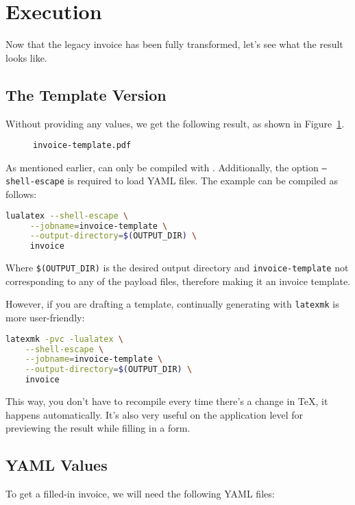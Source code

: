\section{Execution}\label{sec:output}
Now that the legacy invoice has been fully transformed, let's see what the result looks like.

\subsection{The Template Version}
Without providing any values, we get the following result, as shown in Figure~\ref{fig:template}.\\
\setlength\fboxsep{0pt}%
\begin{figure}[!ht]%
    \caption{\texttt{invoice-template.pdf}}\label{fig:template}%
\end{figure}
As mentioned earlier,  can only be compiled with \LuaLaTeX.
Additionally, the option \texttt{--shell-escape} is required to load YAML files.
The example can be compiled as follows:
\begin{lstlisting}[language=bash,caption={Compiling with \texttt{lualatex}}]
lualatex --shell-escape \
     --jobname=invoice-template \
     --output-directory=$(OUTPUT_DIR) \
     invoice
\end{lstlisting}
Where \texttt{\$(OUTPUT\_DIR)} is the desired output directory and \texttt{invoice-template} not corresponding to any of the payload files, therefore making it an invoice template.

However, if you are drafting a template, continually generating with \texttt{latexmk} is more user-friendly:
\begin{lstlisting}[language=bash,caption={Compiling with \texttt{latexmk}}]
latexmk -pvc -lualatex \
    --shell-escape \
    --jobname=invoice-template \
    --output-directory=$(OUTPUT_DIR) \
    invoice
\end{lstlisting}
This way, you don't have to recompile every time there's a change in \TeX, it happens automatically.
It's also very useful on the application level for previewing the result while filling in a form.

\subsection{YAML Values}
To get a filled-in invoice, we will need the following YAML files:

